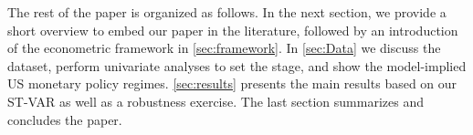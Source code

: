 
The rest of the paper is organized as follows. In the next section, we provide a short  overview to embed our paper in the literature, followed by an introduction of the econometric framework in \autoref{sec:framework}. In \autoref{sec:Data} we discuss the dataset, perform univariate analyses to set the stage, and show the model-implied US monetary policy regimes.  \autoref{sec:results} presents the main results based on our ST-VAR as well as a robustness exercise. The last section summarizes and concludes the paper.
